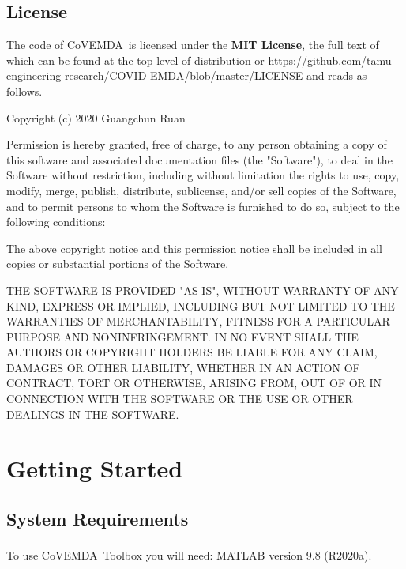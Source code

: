 \documentclass[11pt]{article}
\newcommand{\covemda}{CoVEMDA}
\numberwithin{equation}{section}
\numberwithin{table}{section}
\numberwithin{figure}{section}
\begin{document}
\subsection{License}
The code of \covemda~is licensed under the \textbf{MIT License}, the full text of which can be found at the top level of distribution or \url{https://github.com/tamu-engineering-research/COVID-EMDA/blob/master/LICENSE} and reads as follows.
\begin{Notice}
Copyright (c) 2020 Guangchun Ruan

Permission is hereby granted, free of charge, to any person obtaining a copy
of this software and associated documentation files (the "Software"), to deal
in the Software without restriction, including without limitation the rights
to use, copy, modify, merge, publish, distribute, sublicense, and/or sell
copies of the Software, and to permit persons to whom the Software is
furnished to do so, subject to the following conditions:

The above copyright notice and this permission notice shall be included in all
copies or substantial portions of the Software.

THE SOFTWARE IS PROVIDED "AS IS", WITHOUT WARRANTY OF ANY KIND, EXPRESS OR
IMPLIED, INCLUDING BUT NOT LIMITED TO THE WARRANTIES OF MERCHANTABILITY,
FITNESS FOR A PARTICULAR PURPOSE AND NONINFRINGEMENT. IN NO EVENT SHALL THE
AUTHORS OR COPYRIGHT HOLDERS BE LIABLE FOR ANY CLAIM, DAMAGES OR OTHER
LIABILITY, WHETHER IN AN ACTION OF CONTRACT, TORT OR OTHERWISE, ARISING FROM,
OUT OF OR IN CONNECTION WITH THE SOFTWARE OR THE USE OR OTHER DEALINGS IN THE
SOFTWARE.
\end{Notice}






\newpage
\section{Getting Started} \label{sec:start}

\subsection{System Requirements}
To use \covemda~Toolbox you will need: MATLAB\textsuperscript{\tiny \textregistered} version 9.8 (R2020a). 
\end{document}
